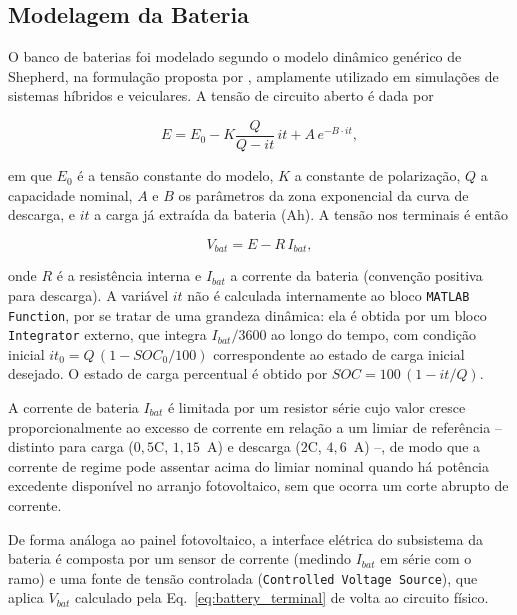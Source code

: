 \subsection{Modelagem da Bateria}
\label{subsec:modelagem_bat_impl}

O banco de baterias foi modelado segundo o modelo dinâmico genérico de
Shepherd, na formulação proposta por \cite{tremblay2007generic}, amplamente
utilizado em simulações de sistemas híbridos e veiculares. A tensão de
circuito aberto é dada por

\begin{equation}
E = E_0 - K\frac{Q}{Q - it}\,it + A\,e^{-B\cdot it},
\label{eq:battery_ocv}
\end{equation}

em que $E_0$ é a tensão constante do modelo, $K$ a constante de
polarização, $Q$ a capacidade nominal, $A$ e $B$ os parâmetros da zona
exponencial da curva de descarga, e $it$ a carga já extraída da bateria
(Ah). A tensão nos terminais é então

\begin{equation}
V_{bat} = E - R\,I_{bat},
\label{eq:battery_terminal}
\end{equation}

onde $R$ é a resistência interna e $I_{bat}$ a corrente da bateria
(convenção positiva para descarga). A variável $it$ não é calculada
internamente ao bloco \texttt{MATLAB Function}, por se tratar de uma
grandeza dinâmica: ela é obtida por um bloco \texttt{Integrator} externo,
que integra $I_{bat}/3600$ ao longo do tempo, com condição inicial
$it_0 = Q\,(1 - SOC_0/100)$ correspondente ao estado de carga inicial
desejado. O estado de carga percentual é obtido por
$SOC = 100\,(1 - it/Q)$.

A corrente de bateria $I_{bat}$ é limitada por um resistor série cujo valor
cresce proporcionalmente ao excesso de corrente em relação a um limiar de
referência -- distinto para carga ($0{,}5\text{C}$, $1{,}15$~A) e descarga
($2\text{C}$, $4{,}6$~A) --, de modo que a corrente de regime pode assentar
acima do limiar nominal quando há potência excedente disponível no
arranjo fotovoltaico, sem que ocorra um corte abrupto de corrente.

De forma análoga ao painel fotovoltaico, a interface elétrica do subsistema
da bateria é composta por um sensor de corrente (medindo $I_{bat}$ em
série com o ramo) e uma fonte de tensão controlada
(\texttt{Controlled Voltage Source}), que aplica $V_{bat}$ calculado pela
Eq.~\eqref{eq:battery_terminal} de volta ao circuito físico.

